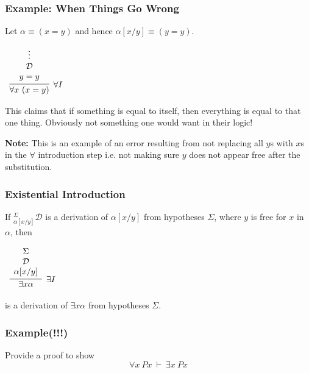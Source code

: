 \documentclass{beamer}
\theoremstyle{indentDefn} \newtheorem{defn}[]{Definition}
\begin{document}
\begin{frame}
	\frametitle{Example: When Things Go Wrong}
	
	Let $\alpha \equiv (x = y)$ and hence $\alpha[x/y] \equiv (y = y)$.

	\begin{center}
		$\begin{array}{c}
			\infer[\forall I]{\forall x \ (x = y)}
				{\begin{array}{c} \vdots \\ \mathcal{D} \\ y = y \end{array}}
		\end{array}$
	\end{center}

	This claims that if something is equal to itself, then everything is equal to that one thing. Obviously not something one would want in their logic!

	{\bf Note:} This is an example of an error resulting from not replacing all $y$s with $x$s in the $\forall$ introduction step i.e. not making sure $y$ does not appear free after the substitution. 

	\vspace{1cm}
	
\end{frame}

\begin{frame}
	\frametitle{Existential Introduction}
	
	If $^{\Sigma}_{\alpha[x/y]}\mathcal{D}$ is a derivation of $\alpha[x/y]$ from hypotheses $\Sigma$, where $y$ is free for $x$ in $\alpha$, then
	
	\vspace{0.5cm}
	
	\begin{center}
		$\begin{array}{c}
		\infer[\exists I]{\exists x \alpha}{\begin{array}{c} 
			\Sigma \\
			\mathcal{D} \\ 
			\alpha[x/y]			
			\end{array}}
		\end{array}$
	\end{center}
	
	is a derivation of $\exists x \alpha$ from hypotheses $\Sigma$. 
	
\end{frame}

\begin{frame}
	\frametitle{Example(!!!)}
	
	Provide a proof to show $$\forall x \ Px \ \vdash \ \exists x \ Px$$
	
	\vspace{60mm}
	
	
\end{frame}
\end{document}
